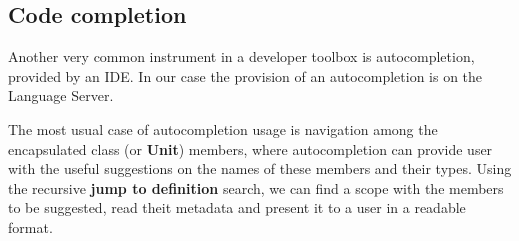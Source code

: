 \subsection{Code completion}

Another very common instrument in a developer toolbox is autocompletion, provided by an IDE.
In our case the provision of an autocompletion is on the Language Server.

The most usual case of autocompletion usage is navigation among the encapsulated class (or \textbf{Unit}) members, where autocompletion
can provide user with the useful suggestions on the names of these members and their types.
Using the recursive \textbf{jump to definition} search, we can find a scope with the members to be suggested, read theit metadata
and present it to a user in a readable format.




